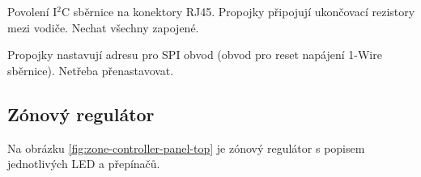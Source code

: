 \begin{Czech}
Povolení I$^2$C sběrnice na konektory RJ45. Propojky připojují ukončovací rezistory mezi vodiče. Nechat všechny zapojené.
\end{Czech}

\begin{Czech}
\end{Czech}

\begin{Czech}
Propojky nastavují adresu pro SPI obvod (obvod pro reset napájení 1-Wire sběrnice).  Netřeba přenastavovat.
\end{Czech}



\newpage
\begin{Czech}
\subsection{Zónový regulátor}
\end{Czech}

\begin{Czech}
Na obrázku \ref{fig:zone-controller-panel-top} je zónový regulátor s popisem jednotlivých LED a přepínačů.
\end{Czech}

